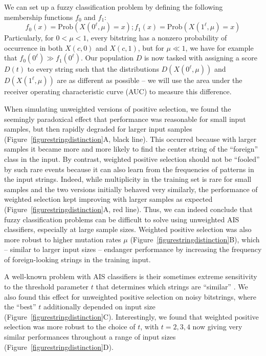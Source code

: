 \documentclass{llncs}
\newcommand{\text}[1]{\textrm{#1}}
\begin{document}
We can set up a fuzzy classification problem by defining the following 
membership functions $f_0$ and $f_1$:
$$
f_0( x ) = \text{Prob}( X(0^\ell,\mu)=x ) ; f_1( x ) = \text{Prob}( X(1^\ell,\mu)=x ) 
$$
Particularly, for $0 < \mu < 1$, every bitstring has a nonzero 
probability of occurrence in both $X(c,0)$ and $X(c,1)$, but for $\mu \ll 1$, we
have for example that $f_0( 0^\ell ) \gg f_1( 0^\ell )$. Our population $D$ 
is now tasked  with assigning a score $D(t)$ to every string such that the 
distributions $D(X(0^\ell,\mu))$ and $D(X(1^\ell,\mu))$ are as different as 
possible -- we will use the area under the receiver operating characteristic
curve (AUC)  to measure this difference.





When simulating unweighted versions of positive selection, we found the seemingly paradoxical 
effect that performance was reasonable for small input samples, but then rapidly degraded for larger
input samples (Figure~\ref{figurestringdistinction}A, black line). This occurred because with larger samples it became more and more likely to find the 
center string of the ``foreign'' class in the input.
By contrast, weighted positive selection 
should not be ``fooled'' by such rare events because it can also learn from the frequencies of
patterns in the input strings. Indeed, while multiplicity in the training set is rare for small
samples and the two versions initially behaved very similarly, the performance
of weighted selection kept improving with larger samples as expected (Figure~\ref{figurestringdistinction}A, red line).
Thus, we can indeed conclude that fuzzy classification problems can be difficult to solve using
unweighted AIS classifiers, especially at large sample sizes.
Weighted positive selection was also more robust to higher mutation 
rates $\mu$ (Figure~\ref{figurestringdistinction}B), which -- similar to larger input 
sizes -- endanger performance by increasing the frequency of foreign-looking 
strings in the training input.

A well-known problem with AIS classifiers  is their sometimes extreme sensitivity to the 
threshold parameter $t$ that determines which strings are ``similar''
\cite{Dhaeseleer1996,Dhaeseleer1996b,Stibor2005,Wortel2020t}.
We also found this effect for 
unweighted positive selection on noisy bitstrings, where the ``best'' $t$ additionally
depended on input size (Figure~\ref{figurestringdistinction}C). Interestingly, we 
found that weighted positive selection was more robust to the choice of $t$, with 
$t = 2,3,4$ now giving very similar performances throughout a range of input sizes (Figure~\ref{figurestringdistinction}D).
\end{document}

